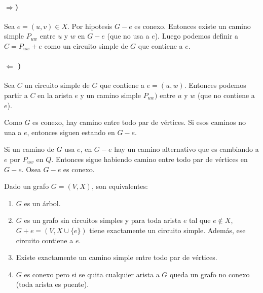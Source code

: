 \begin{demo} 
	\paragraph{\(\Rightarrow\))} Sea \(e =(u,v)\in X\). Por hipotesis \(G-e\) es conexo. Entonces existe un camino simple \(P_{uw}\) entre \(u\) y \(w\) en \(G - e\) (que no usa a \(e\)). Luego podemos definir a \(C = P_{uw} + e\) como un circuito simple de \(G\) que contiene a \(e\).
	
	\paragraph{\(\Leftarrow\) )} Sea \(C\) un circuito simple de \(G\) que contiene a \(e = (u,w)\). Entonces podemos partir a \(C\) en la arista \(e\) y un camino simple \(P_{uw})\) entre \(u\) y \(w\) (que no contiene a \(e\)).

	Como \(G\) es conexo, hay camino entre todo par de vértices. Si esos caminos no una a \(e\), entonces siguen estando en \(G-e\).
	
	Si un camino de \(G\) usa \(e\), en \(G-e\) hay un camino alternativo que es cambiando a \(e\) por \(P_{uw}\) en \(Q\). Entonces sigue habiendo camino entre todo par de vértices en \(G-e\). Osea \(G-e\) es conexo.
\end{demo}
\begin{theorem}
	Dado un grafo \(G=(V,X)\), son equivalentes:
	\begin{enumerate}
		\item \(G\) es un árbol.
		\item \(G\) es un grafo sin circuitos simples y para toda arista \(e\) tal que \(e\notin X\), \(G+e = (V, X\cup\{e\})\) tiene exactamente un circuito simple. Además, ese circuito contiene a \(e\).
		\item Existe exactamente un camino simple entre todo par de vértices.
		\item \(G\) es conexo pero si se quita cualquier arista a \(G\) queda un grafo no conexo (toda arista es puente).
	\end{enumerate}
\end{theorem}

\newpage
\appendix
